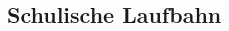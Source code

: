 \documentclass[
	10pt, %
]{FreemanCV}
\begin{document}
\begin{paracol}{2}




\medskip %



%
%

\section{Schulische Laufbahn}



\end{paracol}
\end{document}
